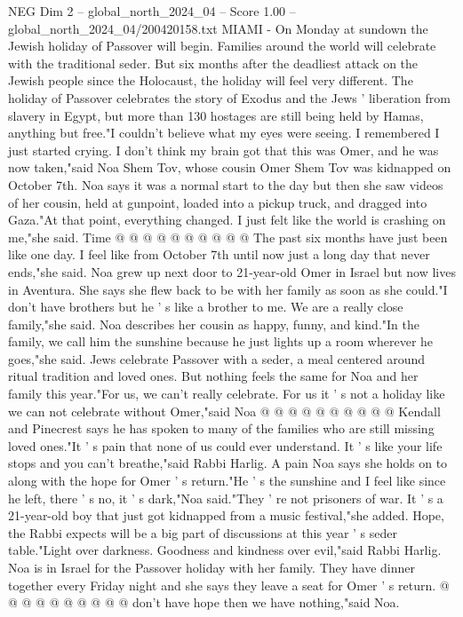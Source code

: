 \begin{textsample}{NEG Dim 2 – global\_north\_2024\_04 – Score 1.00 – global\_north\_2024\_04/200420158.txt}  \label{ex:f2_neg_183}
MIAMI - On Monday at sundown the Jewish holiday of Passover will begin.
Families around the world will celebrate with the traditional seder.
But six months after the deadliest attack on the Jewish people since the Holocaust, the holiday will feel very different.
The holiday of Passover celebrates the story of Exodus and the Jews ' liberation from slavery in Egypt, but more than 130 hostages are still being held by Hamas, anything but free."I couldn't believe what my eyes were seeing.
I remembered I just started crying.
I don't think my brain got that this was Omer, and he was now taken,"said Noa Shem Tov, whose cousin Omer Shem Tov was kidnapped on October 7th.
Noa says it was a normal start to the day but then she saw videos of her cousin, held at gunpoint, loaded into a pickup truck, and dragged into Gaza."At that point, everything changed.
I just felt like the world is crashing on me,"she said.
Time @ @ @ @ @ @ @ @ @ @ The past six months have just been like one day.
I feel like from October 7th until now just a long day that never ends,"she said.
Noa grew up next door to 21-year-old Omer in Israel but now lives in Aventura.
She says she flew back to be with her family as soon as she could."I don't have brothers but he ' s like a brother to me.
We are a really close family,"she said.
Noa describes her cousin as happy, funny, and kind."In the family, we call him the sunshine because he just lights up a room wherever he goes,"she said.
Jews celebrate Passover with a seder, a meal centered around ritual tradition and loved ones.
But nothing feels the same for Noa and her family this year."For us, we can't really celebrate.
For us it ' s not a holiday like we can not celebrate without Omer,"said Noa @ @ @ @ @ @ @ @ @ @ Kendall and Pinecrest says he has spoken to many of the families who are still missing loved ones."It ' s pain that none of us could ever understand.
It ' s like your life stops and you can't breathe,"said Rabbi Harlig.
A pain Noa says she holds on to along with the hope for Omer ' s return."He ' s the sunshine and I feel like since he left, there ' s no, it ' s dark,"Noa said."They ' re not prisoners of war.
It ' s a 21-year-old boy that just got kidnapped from a music festival,"she added.
Hope, the Rabbi expects will be a big part of discussions at this year ' s seder table."Light over darkness.
Goodness and kindness over evil,"said Rabbi Harlig.
Noa is in Israel for the Passover holiday with her family.
They have dinner together every Friday night and she says they leave a seat for Omer ' s return. @ @ @ @ @ @ @ @ @ @ don't have hope then we have nothing,"said Noa.

\end{textsample}
